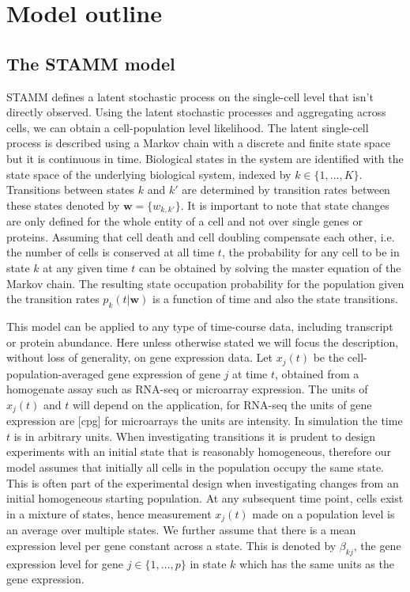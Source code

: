 \section{Model outline}
\label{sec:method}

\subsection{The STAMM model}
\label{sec:mast-model}


STAMM defines a latent stochastic process on the single-cell level that isn't directly observed. Using the latent stochastic processes and aggregating across cells, we can obtain a cell-population level likelihood. The latent single-cell process is described using a Markov chain with a discrete and finite state space but it is continuous in time. Biological states in the system are identified with the state space of the underlying biological system, indexed by $k \in \lbrace 1, ..., K \rbrace$. Transitions between states $k$ and $k'$ are determined by transition rates between these states denoted by $\mathbf{w} = \lbrace w_{k,k'} \rbrace $. It is important to note that state changes are only defined for the whole entity of a cell and  not over single genes or proteins. Assuming that cell death and cell doubling compensate each other, i.e. the number of cells is conserved at all time $t$, the probability for any cell to be in state $k$ at any given time $t$ can be obtained by solving the master equation of the Markov chain. The resulting state occupation probability for the population given the transition rates $p_k(t|\mathbf{w})$ is a function of time and also the state transitions.

This model can be applied to any type of time-course data, including transcript or protein abundance. Here unless otherwise stated we will focus the description, without loss of generality, on gene expression data. Let $x_j(t)$ be the cell-population-averaged gene expression of gene $j$ at time $t$, obtained from a homogenate assay such as RNA-seq or microarray expression. The units of $x_j(t)$ and $t$ will depend on the application, for RNA-seq the units of gene expression are [cpg] for microarrays the units are intensity. In simulation the time $t$ is in arbitrary units.  When investigating transitions it is prudent to design experiments with an initial state that is reasonably homogeneous, therefore our model assumes that initially all cells in the population occupy the same state. This is often part of the experimental design when investigating changes from an initial homogeneous starting population. At any subsequent time point, cells exist in a mixture of states, hence measurement $x_j(t)$ made on a population level is an average over multiple states. We further assume that there is a mean expression level per gene constant across a state. This is denoted by $\beta_{kj}$, the gene expression level for gene $j \in \lbrace 1, \ldots, p \rbrace$ in state $k$ which has the same units as the gene expression.

